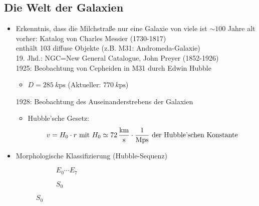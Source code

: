 \subsection{Die Welt der Galaxien}
\begin{itemize}
	\item Erkenntnis, dass die Milchstraße nur eine Galaxie von viele ist $\sim \num{100}$ Jahre alt\\
		vorher: Katalog von Charles Messier (1730-1817)\\
		enthält 103 diffuse Objekte (z.B. M31: Andromeda-Galaxie)\\
		19. Jhd.: NGC=New General Catalogue, John Preyer (1852-1926)\\
		1925: Beobachtung von Cepheiden in M31 durch Edwin Hubble\\
		\begin{itemize}
			\item $D=\SI{285}{k\ps}$ (Aktueller: $\SI{770}{k\ps}$)
		\end{itemize}
		1928: Beobachtung des Auseinanderstrebens der Galaxien
		\begin{itemize}
			\item[] Hubble'sche Gesetz:
				\begin{equation*}
					v=H_0\cdot r \text{ mit } H_0\simeq \SI{72}{\frac{\km}{\s}\cdot\frac{1}{M\ps}} \text{ der Hubble'schen Konstante}
				\end{equation*}
		\end{itemize}
	\item Morphologische Klassifizierung (Hubble-Sequenz)
		\begin{figure}[H]
			\begin{multicols}{2}
				\begin{figure}[H]
					\centering
					\caption{$E_0\cdots E_7$}
				\end{figure}\columnbreak
				\begin{figure}[H]
					\centering
					\caption{$S_0$}
				\end{figure}
			\end{multicols}

\end{figure}
\end{itemize}
